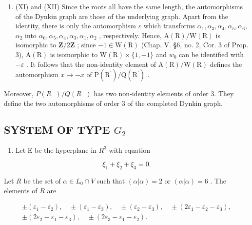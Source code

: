 \begin{enumerate}
\def\labelenumi{(\Roman{enumi})}
\setcounter{enumi}{10}
\tightlist
\item
  (XI) and (XII) Since the roots all have the same length, the automorphisms of the Dynkin graph are those of the underlying graph. Apart from the identity, there is only the automorphism \(\varepsilon\) which transforms \(\alpha_{1},\alpha_{3},\alpha_{4},\alpha_{5},\alpha_{6},\) \(\alpha_{2}\) into \(\alpha_{6},\alpha_{5},\alpha_{4},\alpha_{3},\alpha_{1},\alpha_{2}\) , respectively. Hence, \(\mathrm{A(R) / W(R)}\) is isomorphic to \(\mathbf{Z} / 2\mathbf{Z}\) ; since \(-1\in \mathrm{W(R)}\) (Chap. V. §6, no. 2, Cor. 3 of Prop. 3), \(\mathrm{A(R)}\) is isomorphic to \(\mathrm{W(R)}\times \{1, - 1\}\) and \(w_0\) can be identified with \(-\varepsilon\) . It follows that the non-identity element of \(\mathrm{A(R) / W(R)}\) defines the automorphism \(x\mapsto -x\) of \(\mathrm{P(R^{\prime}) / Q(R^{\prime})}\) .
\end{enumerate}

Moreover, \(P(R^{-})/Q(R^{-})\) has two non-identity elements of order 3. They define the two automorphisms of order 3 of the completed Dynkin graph.

\subsection{\texorpdfstring{SYSTEM OF TYPE \(G_{2}\)}{SYSTEM OF TYPE G\_2}}

\begin{enumerate}
\def\labelenumi{(\Roman{enumi})}
\tightlist
\item
  Let E be the hyperplane in \(R^{3}\) with equation
\end{enumerate}

\[
\xi_ {1} + \xi_ {2} + \xi_ {3} = 0.
\]

Let \(R\) be the set of \(\alpha \in L_0 \cap V\) such that \((\alpha | \alpha) = 2\) or \((\alpha | \alpha) = 6\) . The elements of \(R\) are

\[
\begin{array}{c} \pm (\varepsilon_ {1} - \varepsilon_ {2}), \quad \pm (\varepsilon_ {1} - \varepsilon_ {3}), \quad \pm (\varepsilon_ {2} - \varepsilon_ {3}), \quad \pm (2 \varepsilon_ {1} - \varepsilon_ {2} - \varepsilon_ {3}), \\ \pm (2 \varepsilon_ {2} - \varepsilon_ {1} - \varepsilon_ {3}), \quad \pm (2 \varepsilon_ {3} - \varepsilon_ {1} - \varepsilon_ {2}). \end{array}
\]

